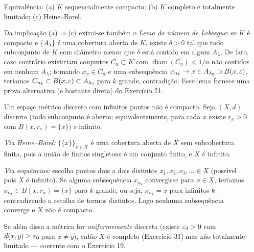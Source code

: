 \begin{exercicio}{Equivalência: (a) $K$ sequencialmente compacto; (b) $K$ completo e totalmente limitado; (c) Heine--Borel.}
\begin{obs}
Da implicação (a)$\Rightarrow$(c) extrai-se também o \emph{Lema do número de Lebesgue}: se $K$ é compacto e $\{A_\lambda\}$ é uma cobertura aberta de $K$, existe $\delta>0$ tal que todo subconjunto de $K$ com diâmetro menor que $\delta$ está contido em algum $A_\lambda$. De fato, caso contrário existiriam conjuntos $C_n\subset K$ com $\operatorname{diam}(C_n)<1/n$ não contidos em nenhum $A_\lambda$; tomando $x_n\in C_n$ e uma subsequência $x_{n_k}\to x\in A_{\lambda_0}\supset B(x,\varepsilon)$, teríamos $C_{n_k}\subset B(x,\varepsilon)\subset A_{\lambda_0}$ para $k$ grande, contradição. Esse lema fornece uma prova alternativa (e bastante direta) do Exercício 21.
\end{obs}
\end{exercicio}

\begin{exercicio}{Um espaço métrico discreto com infinitos pontos não é compacto.}
\sol
Seja $(X,d)$ discreto (todo subconjunto é aberto; equivalentemente, para cada $x$ existe $r_x>0$ com $B(x,r_x)=\{x\}$) e infinito.

\emph{Via Heine--Borel:} $\{\{x\}\}_{x\in X}$ é uma cobertura aberta de $X$ sem subcobertura finita, pois a união de finitos singletons é um conjunto finito, e $X$ é infinito.

\emph{Via sequências:} escolha pontos dois a dois distintos $x_1,x_2,x_3,\dots\in X$ (possível pois $X$ é infinito). Se alguma subsequência $x_{n_k}$ convergisse para $x\in X$, teríamos $x_{n_k}\in B(x,r_x)=\{x\}$ para $k$ grande, ou seja, $x_{n_k}=x$ para infinitos $k$ --- contradizendo a escolha de termos distintos. Logo nenhuma subsequência converge e $X$ não é compacto.

\begin{obs}
Se além disso a métrica for \emph{uniformemente} discreta (existe $\varepsilon_0>0$ com $d(x,y)\ge\varepsilon_0$ para $x\neq y$), então $X$ é completo (Exercício 31) mas não totalmente limitado --- coerente com o Exercício 19.
\end{obs}
\end{exercicio}
